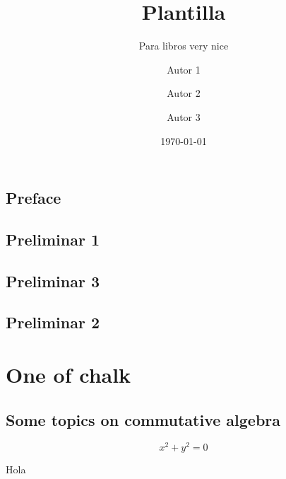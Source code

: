 \documentclass[draft]{qx-files/qx-book}
\title{Plantilla}
\author{Autor 1 \and Autor 2 \and Autor 3}
\date{\today}
\subtitle{Para libros very nice}
\begin{document}
\MakeBookCover

\frontmatter


\maketitle





\chapter*{Preface}

\lipsum[1]




\tableofcontents

\chapter{Preliminar 1}
\lipsum

\chapter{Preliminar 3}
\lipsum

\chapter{Preliminar 2}
\lipsum

\mainmatter

\part{One of chalk}


\chapter[Álgebra conmutativa]{Some topics on commutative algebra}
\lipsum[1-20]
\begin{equation}
  x^2 + y^2 = 0
\end{equation}



\lipsum[1]


\lipsum[1]

\begin{theorem}
  Hola
\end{theorem}



\lipsum[1]
\end{document}
